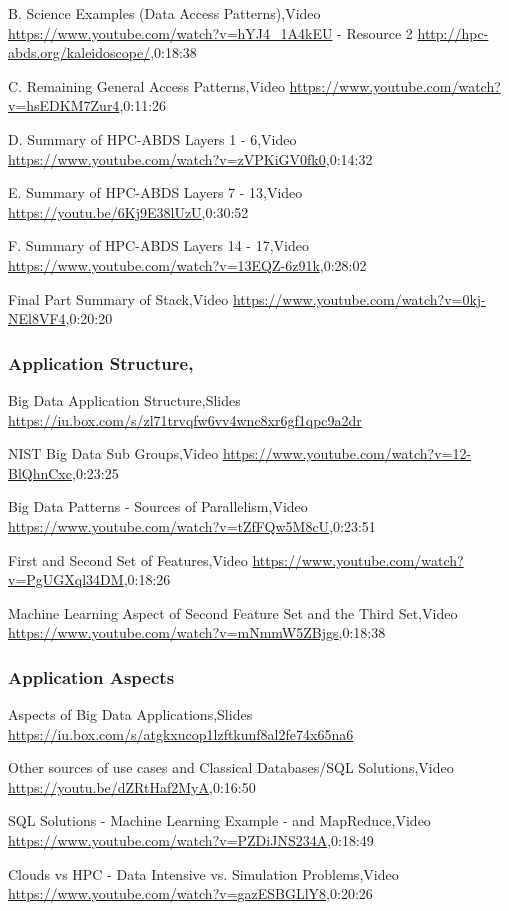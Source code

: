 \documentclass{article}
\begin{document}
B. Science Examples (Data Access Patterns),Video \url{https://www.youtube.com/watch?v=hYJ4_1A4kEU} -  Resource 2 \url{http://hpc-abds.org/kaleidoscope/},0:18:38

C. Remaining General Access Patterns,Video \url{https://www.youtube.com/watch?v=hsEDKM7Zur4},0:11:26

D. Summary of HPC-ABDS Layers 1 - 6,Video \url{https://www.youtube.com/watch?v=zVPKiGV0fk0},0:14:32

E. Summary of HPC-ABDS Layers 7 - 13,Video \url{https://youtu.be/6Kj9E38lUzU},0:30:52

F. Summary of HPC-ABDS Layers 14 - 17,Video \url{https://www.youtube.com/watch?v=13EQZ-6z91k},0:28:02

Final Part Summary of Stack,Video \url{https://www.youtube.com/watch?v=0kj-NEl8VF4},0:20:20

\subsubsection{Application Structure,}

Big Data Application Structure,Slides \url{https://iu.box.com/s/zl71trvqfw6vv4wnc8xr6gf1qpc9a2dr}

NIST Big Data Sub Groups,Video \url{https://www.youtube.com/watch?v=12-BlQhnCxc},0:23:25

Big Data Patterns - Sources of Parallelism,Video \url{https://www.youtube.com/watch?v=tZfFQw5M8cU},0:23:51

First and Second Set of Features,Video \url{https://www.youtube.com/watch?v=PgUGXql34DM},0:18:26

Machine Learning Aspect of Second Feature Set and the Third Set,Video \url{https://www.youtube.com/watch?v=mNmmW5ZBjgs},0:18:38

\subsubsection{Application Aspects}

Aspects of Big Data Applications,Slides \url{https://iu.box.com/s/atgkxucop1lzftkunf8al2fe74x65na6}

Other sources of use cases and Classical Databases/SQL Solutions,Video \url{https://youtu.be/dZRtHaf2MyA},0:16:50

SQL Solutions -  Machine Learning Example -  and MapReduce,Video \url{https://www.youtube.com/watch?v=PZDiJNS234A},0:18:49

Clouds vs HPC -  Data Intensive vs. Simulation Problems,Video \url{https://www.youtube.com/watch?v=gazESBGLlY8},0:20:26
\end{document}
